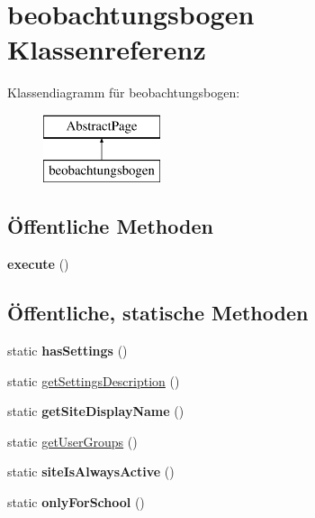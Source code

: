 \hypertarget{classbeobachtungsbogen}{}\section{beobachtungsbogen Klassenreferenz}
\label{classbeobachtungsbogen}
Klassendiagramm für beobachtungsbogen\+:\begin{figure}[H]
\begin{center}
\leavevmode
\includegraphics[height=2.000000cm]{classbeobachtungsbogen}
\end{center}
\end{figure}
\subsection*{Öffentliche Methoden}
\begin{DoxyCompactItemize}
\item 
\mbox{\label{classbeobachtungsbogen_a81f72c06bc42d5a3e4423c53fbca875d}} 
{\bfseries execute} ()
\end{DoxyCompactItemize}
\subsection*{Öffentliche, statische Methoden}
\begin{DoxyCompactItemize}
\item 
\mbox{\label{classbeobachtungsbogen_ac9cd32d1e817ea58bb6a5600d2928235}} 
static {\bfseries has\+Settings} ()
\item 
static \mbox{\hyperlink{classbeobachtungsbogen_a049bb9889085cdffb900789abd57f62e}{get\+Settings\+Description}} ()
\item 
\mbox{\label{classbeobachtungsbogen_aed913ddb8a7e20ccbd616c783c80d68a}} 
static {\bfseries get\+Site\+Display\+Name} ()
\item 
static \mbox{\hyperlink{classbeobachtungsbogen_a5a51d56bd2068eb864f45a5554f38b41}{get\+User\+Groups}} ()
\item 
\mbox{\label{classbeobachtungsbogen_a6f79af24211dc3218d0f1d93f362683d}} 
static {\bfseries site\+Is\+Always\+Active} ()
\item 
\mbox{\label{classbeobachtungsbogen_af49b0903a5ec592d6616df7e67535ffe}} 
static {\bfseries only\+For\+School} ()
\end{DoxyCompactItemize}
